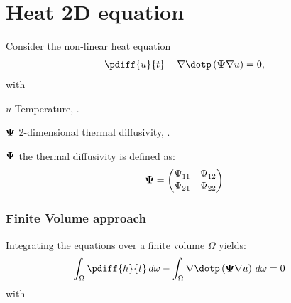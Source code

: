 \chapter{Heat 2D equation}
Consider the non-linear heat equation
\begin{subequations}
    \begin{align}
    \pdiff{u}{t}
    - \nabla \dotp \left( \bPsi \nabla u \right) = 0,
\end{align}
\end{subequations}
with
\begin{symbollist}
    \item[$u$] Temperature, \bunit{\celsius}.
    \item[$\boldsymbol{\Psi}$] 2-dimensional thermal diffusivity, \bunit{\square\metre\per\second}.
\end{symbollist}
$\boldsymbol{\Psi}$ the thermal diffusivity is defined as:
\begin{align}
    \boldsymbol{\Psi} =
    \begin{pmatrix}
        \Psi_{11} & \Psi_{12} \\
        \Psi_{21} & \Psi_{22}
    \end{pmatrix}
\end{align}

\subsection*{Finite Volume approach}
Integrating the equations over a finite volume $\Omega$ yields:
\begin{align}
    \int_\Omega \pdiff{h}{t}\, d\omega &
    - \int_\Omega \nabla \dotp \left( \bPsi \nabla u \right) \, d\omega = 0
    \label{eq:heat_2d_equation}
\end{align}
with



